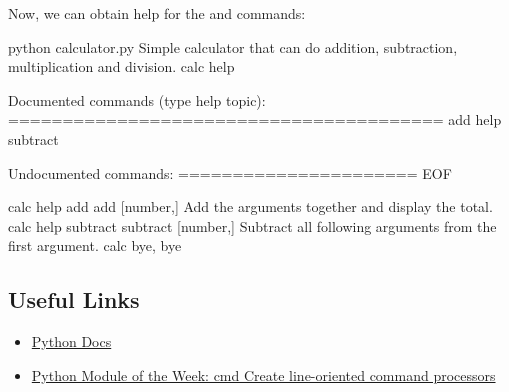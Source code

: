 \begin{sphinxVerbatim}[commandchars=\\\{\}]
       
              \PYG{p}{[}
              \PYG{p}{]}

        
               


   
\end{sphinxVerbatim}

Now, we can obtain help for the  and  commands:

\begin{sphinxVerbatim}[commandchars=\\\{\}]
\PYGZdl{} python calculator.py
Simple calculator that can do addition, subtraction, multiplication and division.
calc \PYGZgt{}\PYGZgt{}\PYGZgt{} help

Documented commands (type help \PYGZlt{}topic\PYGZgt{}):
========================================
add  help  subtract

Undocumented commands:
======================
EOF

calc \PYGZgt{}\PYGZgt{}\PYGZgt{} help add
add [number,]
Add the arguments together and display the total.
calc \PYGZgt{}\PYGZgt{}\PYGZgt{} help subtract
subtract [number,]
Subtract all following arguments from the first argument.
calc \PYGZgt{}\PYGZgt{}\PYGZgt{} bye, bye
\end{sphinxVerbatim}


\subsection{Useful Links}
\label{\detokenize{lesson/prg/python_cmd:useful-links}}\begin{itemize}
\item {} 
\href{https://docs.python.org/2/library/cmd.html}{Python Docs}

\item {} 
\href{https://pymotw.com/2/cmd/}{Python Module of the Week: cmd \textendash{} Create line-oriented command processors}

\end{itemize}


